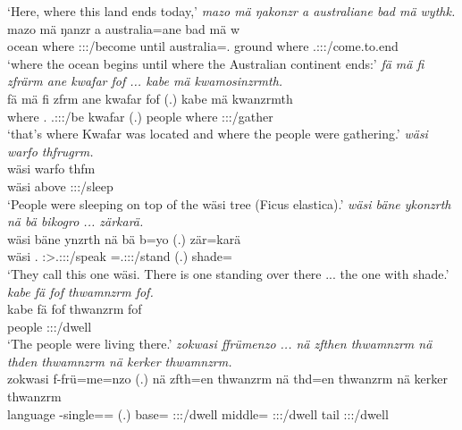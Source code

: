 \begin{exe}
	\trans `Here, where this land ends today,'
	\emph{mazo mä ŋakonzr a australiane bad mä wythk.}\\
	\gll mazo mä ŋanzr a australia=ane bad mä w\\ 
	ocean where \Stsg:\Sbj:\Nonpast:\Ipfv/become until australia=\Poss.\Sg{} ground where \Tsg.\F:\Sbj:\Nonpast:\Ipfv/come.to.end\\
	\trans `where the ocean begins until where the Australian continent ends:'
	\emph{fä mä fi zfrärm ane kwafar fof ... kabe mä kwamosinzrmth.}\\
	\gll fä mä fi zfrm ane kwafar fof (.) kabe mä kwanzrmth \\ 
	\Dist{} where \Third.\Abs{} \Tsg.\F:\Sbj:\Pst:\Dur/be \Dem{} kwafar \Emph{} (.) people where \Stpl:\Sbj:\Pst:\Dur/gather\\
	\trans `that's where Kwafar was located and where the people were gathering.'
	\emph{wäsi warfo thfrugrm.}\\
	\gll wäsi warfo thfm\\ 
	wäsi above \Stpl:\Sbj:\Pst:\Dur/sleep\\
	\trans `People were sleeping on top of the wäsi tree (Ficus elastica).'
	\emph{wäsi bäne ykonzrth nä bä bikogro ... zärkarä.}\\
	\gll wäsi bäne ynzrth nä bä b=yo (.) zär=karä\\ 
	wäsi \Dem.\Med{} \Stpl:\Sbj>\Tsg.\Masc:\Obj:\Nonpast:\Ipfv/speak \Indf{} \Med{} \Med=\Tsg.\Masc:\Nonpast:\Ipfv:\Andat/stand (.) shade=\Prop{}\\
	\trans `They call this one wäsi. There is one standing over there ... the one with shade.'
	\emph{kabe fä fof thwamnzrm fof.}\\
	\gll kabe fä fof thwanzrm fof\\ 
	people \Dist{} \Emph{} \Stpl:\Sbj:\Pst:\Dur/dwell \Emph{}\\
	\trans `The people were living there.'
	\emph{zokwasi ffrümenzo ... nä zfthen thwamnzrm nä thden thwamnzrm nä kerker thwamnzrm.}\\
	\gll zokwasi f-frü=me=nzo (.) nä zfth=en thwanzrm nä thd=en thwanzrm nä kerker thwanzrm\\ 
	language \Redup-single=\Ins=\Only{} (.) \Indf{} base=\Loc{} \Stpl:\Sbj:\Pst:\Dur/dwell \Indf{} middle=\Loc{} \Stpl:\Sbj:\Pst:\Dur/dwell \Indf{} tail \Stpl:\Sbj:\Pst:\Dur/dwell\\

\end{exe}

